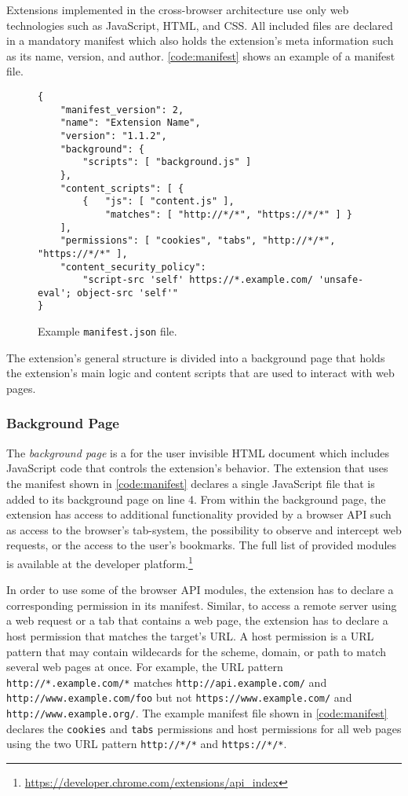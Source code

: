 	Extensions implemented in the cross-browser architecture use only web technologies such as JavaScript, HTML, and CSS. All included files are declared in a mandatory manifest which also holds the extension's meta information such as its name, version, and author. \autoref{code:manifest} shows an example of a manifest file. 
	
	\begin{figure}[h]
		\begin{lstlisting}
{
	"manifest_version": 2,
	"name": "Extension Name",
	"version": "1.1.2",
	"background": {
		"scripts": [ "background.js" ]
	},
	"content_scripts": [ {
		{ 	"js": [ "content.js" ],
			"matches": [ "http://*/*", "https://*/*" ] }
	],
	"permissions": [ "cookies", "tabs", "http://*/*", "https://*/*" ],
	"content_security_policy": 
		"script-src 'self' https://*.example.com/ 'unsafe-eval'; object-src 'self'"
}
\end{lstlisting}
		\caption{Example \texttt{manifest.json} file.}
		\label{code:manifest}
	\end{figure}
	
	The extension's general structure is divided into a background page that holds the extension's main logic and content scripts that are used to interact with web pages.
	
\subsubsection{Background Page}

	The \textit{background page} is a for the user invisible HTML document which includes JavaScript code that controls the extension's behavior. The extension that uses the manifest shown in \autoref{code:manifest} declares a single JavaScript file that is added to its background page on line 4. From within the background page, the extension has access to additional functionality provided by a browser API such as access to the browser's tab-system, the possibility to observe and intercept web requests, or the access to the user's bookmarks. The full list of provided modules is available at the developer platform.\footnote{\url{https://developer.chrome.com/extensions/api_index}}
	
	In order to use some of the browser API modules, the extension has to declare a corresponding permission in its manifest. Similar, to access a remote server using a web request or a tab that contains a web page, the extension has to declare a host permission that matches the target's URL. A host permission is a URL pattern that may contain wildecards for the scheme, domain, or path to match several web pages at once. For example, the URL pattern \texttt{http://*.example.com/*} matches \texttt{http://api.example.com/} and \texttt{http://www.example.com/foo} but not \texttt{https://www.example.com/} and \texttt{http://www.example.org/}. The example manifest file shown in \autoref{code:manifest} declares the \texttt{cookies} and \texttt{tabs} permissions and host permissions for all web pages using the two URL pattern \texttt{http://*/*} and \texttt{https://*/*}.	
	
